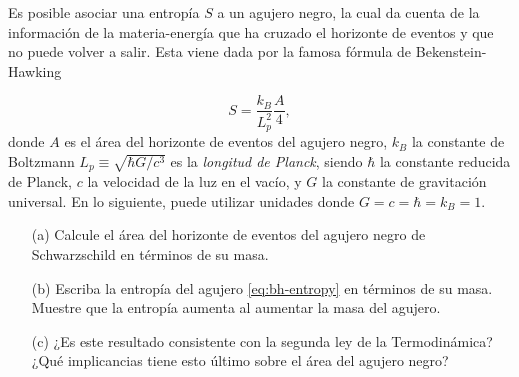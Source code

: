 
\question[2] 
Es posible asociar una entropía $S$ a un agujero negro, la cual da cuenta de la
información de la materia-energía que ha cruzado el horizonte de eventos y que no puede volver a
salir. Esta viene dada por la famosa fórmula de Bekenstein-Hawking

\begin{equation}
  S = \frac{k_B}{L^2_p}\frac{A}{4}, \label{eq:bh-entropy}
\end{equation}
donde $A$ es el área del horizonte de eventos del agujero negro, $k_B$ la
constante de Boltzmann $L_p\equiv\sqrt{\hbar G/c^3}$ es la \textit{longitud de
Planck}, siendo $\hbar$ la constante reducida de Planck, $c$ la velocidad de
la luz en el vacío, y $G$ la constante de gravitación universal. En lo
siguiente, puede utilizar unidades donde $G=c=\hbar=k_B=1$.

\begin{itemize}
  \item[(a)] Calcule el área del horizonte de eventos del agujero negro de
    Schwarzschild en términos de su masa.
    
  \item[(b)] Escriba la entropía del agujero \eqref{eq:bh-entropy} en términos de su masa.
      Muestre que la entropía aumenta al aumentar la masa del agujero.

  \item[(c)] ¿Es este resultado consistente con la segunda ley de la
    Termodinámica? ¿Qué implicancias tiene esto último sobre el área del agujero negro?
\end{itemize}


\droptotalpoints
